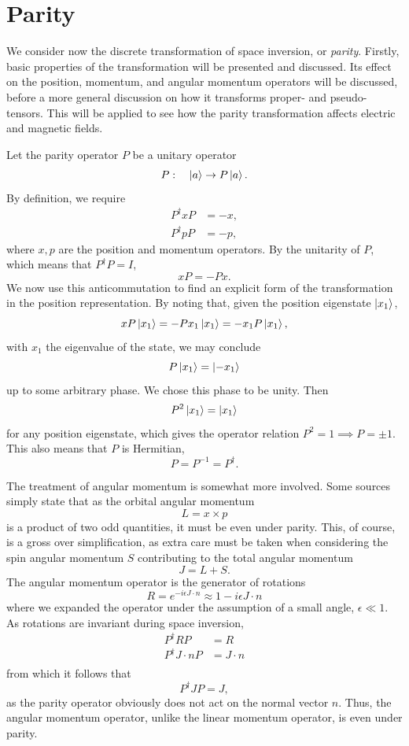 \section{Parity}
We consider now the discrete transformation of space inversion, or \emph{parity}.
Firstly, basic properties of the transformation will be presented and discussed.
Its effect on the position, momentum, and angular momentum operators will be discussed, before a more general discussion on how it transforms proper- and pseudo-tensors.
This will be applied to see how the parity transformation affects electric and magnetic fields.

Let the parity operator $P$ be a unitary operator
\begin{equation}
  P: \quad \ket{a} \rightarrow P\ket{a}.
\end{equation}
By definition, we require
\begin{align}
  P^\dagger x P &= -x,\\
  P^\dagger p P &= -p,
\end{align}
where $x, p$ are the position and momentum operators.
By the unitarity of $P$, which means that $P^\dagger P = I$,
$$
xP = -Px.
$$
We now use this anticommutation to find an explicit form of the transformation in the position representation.
By noting that, given the position eigenstate $\ket{x_1}$,
\begin{equation}
  x P\ket{x_1} = -P x_1\ket{x_1} = -x_1 P\ket{x_1},
\end{equation}
with $x_1$ the eigenvalue of the state, we may conclude
$$
P\ket{x_1} = \ket{-x_1}
$$
up to some arbitrary phase.
We chose this phase to be unity.
Then
\begin{equation}
  P^2 \ket{x_1} = \ket{x_1}
\end{equation}
for any position eigenstate, which  gives the  operator relation $P^2 = 1 \implies P = \pm 1$.
This also means that $P$ is Hermitian,
$$
P = P^{-1} = P^\dagger.
$$

The treatment of angular momentum is somewhat more involved.
Some sources simply state that as the orbital angular momentum
$$
L = x \times p
$$
is a product of two odd quantities, it must be even under parity.
This, of course, is a gross over simplification, as extra care must be taken when considering the spin angular momentum $S$ contributing to the total angular momentum
$$
J = L + S.
$$
The angular momentum operator is the generator of rotations
$$
R = e^{-i \epsilon J\cdot n} \approx 1 - i \epsilon J \cdot n
$$
where we expanded the operator under the assumption of a small angle, $\epsilon \ll 1$.
As rotations are invariant during space inversion,
\begin{align*}
  P^\dagger R P &= R\\
  P^\dagger J \cdot n P &= J\cdot n\\
\end{align*}
from which it follows that
$$
P^\dagger J P = J,
$$
as the parity operator obviously does not act on the normal vector $n$.
Thus, the angular momentum operator, unlike the linear momentum operator, is even under parity.

